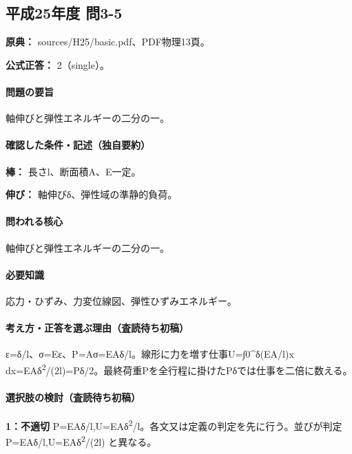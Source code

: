 \subsection{平成25年度 問3-5}
\label{q:h25-reg-basic-3-5}

\noindent\textbf{原典：} sources/H25/basic.pdf、PDF物理13頁。

\textbf{公式正答：} 2（single）。

\paragraph{問題の要旨} 軸伸びと弾性エネルギーの二分の一。

\paragraph{確認した条件・記述（独自要約）}\mbox{}\par

\noindent\textbf{棒：} 長さl、断面積A、E一定。\par

\noindent\textbf{伸び：} 軸伸びδ、弾性域の準静的負荷。\par

\paragraph{問われる核心} 軸伸びと弾性エネルギーの二分の一。

\paragraph{必要知識} 応力・ひずみ、力変位線図、弾性ひずみエネルギー。

\paragraph{考え方・正答を選ぶ理由（査読待ち初稿）} ε=δ/l、σ=Eε、P=\allowbreak{}Aσ=EAδ/l。線形に力を増す仕事U=∫0\textasciicircum{}δ(EA/l)x dx=\allowbreak{}EAδ\textsuperscript{2}/(2l)=\allowbreak{}Pδ/2。最終荷重Pを全行程に掛けたPδでは仕事を二倍に数える。

\paragraph{選択肢の検討（査読待ち初稿）}\mbox{}\par

\noindent\textbf{1：不適切} P=\allowbreak{}EAδ/l,U=\allowbreak{}EAδ\textsuperscript{2}/l。各文又は定義の判定を先に行う。並びが判定 P=\allowbreak{}EAδ/l,U=\allowbreak{}EAδ\textsuperscript{2}/(2l) と異なる。\par


